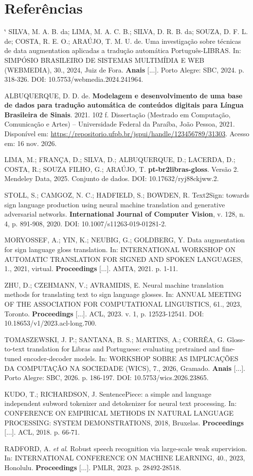 \documentclass[12pt]{article}
\makeatletter
\renewenvironment{thebibliography}[1]
  {\section*{Referências}\footnotesize
   \list{\@biblabel{\@arabic\c@enumiv}}%
        {\settowidth\labelwidth{\@biblabel{#1}}\leftmargin\labelwidth
         \advance\leftmargin\labelsep\itemsep 3pt\usecounter{enumiv}%
         \let\p@enumiv\@empty\renewcommand\theenumiv{\@arabic\c@enumiv}}%
   \sloppy\clubpenalty4000\widowpenalty4000\sfcode`\.\@m}
  {\endlist}
\makeatother
\begin{document}
\begin{thebibliography}{99}
 SILVA, M. A. B. da; LIMA, M. A. C. B.; SILVA, D. R. B. da; SOUZA, D. F. L. de; COSTA, R. E. O.; ARAÚJO, T. M. U. de. Uma investigação sobre técnicas de data augmentation aplicadas a tradução automática Português-LIBRAS. In: SIMPÓSIO BRASILEIRO DE SISTEMAS MULTIMÍDIA E WEB (WEBMEDIA), 30., 2024, Juiz de Fora. \textbf{Anais} [...]. Porto Alegre: SBC, 2024. p. 318-326. DOI: 10.5753/webmedia.2024.241964.

 ALBUQUERQUE, D. D. de. \textbf{Modelagem e desenvolvimento de uma base de dados para tradução automática de conteúdos digitais para Língua Brasileira de Sinais}. 2021. 102 f. Dissertação (Mestrado em Computação, Comunicação e Artes) -- Universidade Federal da Paraíba, João Pessoa, 2021. Disponível em: \url{https://repositorio.ufpb.br/jspui/handle/123456789/31303}. Acesso em: 16 nov. 2026.

 LIMA, M.; FRANÇA, D.; SILVA, D.; ALBUQUERQUE, D.; LACERDA, D.; COSTA, R.; SOUZA FILHO, G.; ARAÚJO, T. \textbf{pt-br2libras-gloss}. Versão 2. Mendeley Data, 2025. Conjunto de dados. DOI: 10.17632/ryj88ckjww.2.

 STOLL, S.; CAMGOZ, N. C.; HADFIELD, S.; BOWDEN, R. Text2Sign: towards sign language production using neural machine translation and generative adversarial networks. \textbf{International Journal of Computer Vision}, v. 128, n. 4, p. 891-908, 2020. DOI: 10.1007/s11263-019-01281-2.

 MORYOSSEF, A.; YIN, K.; NEUBIG, G.; GOLDBERG, Y. Data augmentation for sign language gloss translation. In: INTERNATIONAL WORKSHOP ON AUTOMATIC TRANSLATION FOR SIGNED AND SPOKEN LANGUAGES, 1., 2021, virtual. \textbf{Proceedings} [...]. AMTA, 2021. p. 1-11.

 ZHU, D.; CZEHMANN, V.; AVRAMIDIS, E. Neural machine translation methods for translating text to sign language glosses. In: ANNUAL MEETING OF THE ASSOCIATION FOR COMPUTATIONAL LINGUISTICS, 61., 2023, Toronto. \textbf{Proceedings} [...]. ACL, 2023. v. 1, p. 12523-12541. DOI: 10.18653/v1/2023.acl-long.700.

 TOMASZEWSKI, J. P.; SANTANA, B. S.; MARTINS, A.; CORRÊA, G. Gloss-to-text translation for Libras and Portuguese: evaluating pretrained and fine-tuned encoder-decoder models. In: WORKSHOP SOBRE AS IMPLICAÇÕES DA COMPUTAÇÃO NA SOCIEDADE (WICS), 7., 2026, Gramado. \textbf{Anais} [...]. Porto Alegre: SBC, 2026. p. 186-197. DOI: 10.5753/wics.2026.23865.

 KUDO, T.; RICHARDSON, J. SentencePiece: a simple and language independent subword tokenizer and detokenizer for neural text processing. In: CONFERENCE ON EMPIRICAL METHODS IN NATURAL LANGUAGE PROCESSING: SYSTEM DEMONSTRATIONS, 2018, Bruxelas. \textbf{Proceedings} [...]. ACL, 2018. p. 66-71.

 RADFORD, A. \emph{et al}. Robust speech recognition via large-scale weak supervision. In: INTERNATIONAL CONFERENCE ON MACHINE LEARNING, 40., 2023, Honolulu. \textbf{Proceedings} [...]. PMLR, 2023. p. 28492-28518.

\end{thebibliography}
\end{document}
